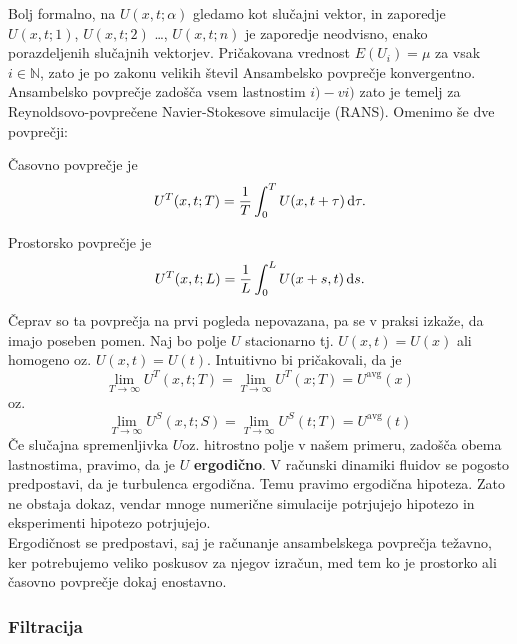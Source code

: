 \documentclass[mat2, tisk]{fmfdelo}
\newcommand{\N}{\mathbb N}
\begin{document}
Bolj formalno, na $U(x, t;\alpha)$ gledamo kot slučajni vektor, in zaporedje 
$U(x, t; 1)$, $U(x, t; 2)$ \dots, $U(x, t;n)$ je zaporedje neodvisno, enako porazdeljenih 
slučajnih vektorjev. Pričakovana vrednost $E(U_i) = \mu$ za vsak $i\in\N$, zato je po 
zakonu velikih števil Ansambelsko povprečje konvergentno.\\

Ansambelsko povprečje zadošča vsem lastnostim $i) - vi)$ zato je temelj za \\
Reynoldsovo-povprečene Navier-Stokesove simulacije (RANS). Omenimo še dve povprečji: 
\begin{definicija}
Časovno povprečje je 
\begin{equation}
U^T(x, t; T) = \frac{1}{T}\int_0^T U(x, t + \tau) \dif \tau.
\end{equation}
\end{definicija}

\begin{definicija}
Prostorsko povprečje je 
\begin{equation}
U^T(x, t; L) = \frac{1}{L}\int_0^L U(x + s, t) \dif s.
\end{equation}
\end{definicija}

Čeprav so ta povprečja na prvi pogleda nepovazana, pa se v praksi izkaže, da imajo poseben 
pomen. Naj bo polje $U$ stacionarno tj. $U(x, t) = U(x)$ ali homogeno oz. $U(x, t) = U(t)$.
Intuitivno bi pričakovali, da je 
$$
\lim_{T\rightarrow \infty} U^T(x, t; T) = \lim_{T\rightarrow \infty} U^T(x; T) = U^\text{avg}(x)
$$
oz. 
$$
\lim_{T\rightarrow \infty} U^S(x, t; S) = \lim_{T\rightarrow \infty} U^S(t; T) = U^\text{avg}(t)
$$
Če slučajna spremenljivka $U $oz. hitrostno polje v našem primeru, zadošča obema lastnostima, 
pravimo, da je $U$ \textbf{ergodično}. V računski dinamiki fluidov se pogosto predpostavi, da je turbulenca ergodična. 
Temu pravimo ergodična hipoteza. Zato ne obstaja dokaz, vendar mnoge numerične simulacije potrjujejo hipotezo 
in eksperimenti hipotezo potrjujejo. \\
Ergodičnost se predpostavi, saj je računanje ansambelskega povprečja težavno, ker potrebujemo 
veliko poskusov za njegov izračun, med tem ko je prostorko ali časovno povprečje dokaj 
enostavno.

\subsubsection{Filtracija}
\end{document}

